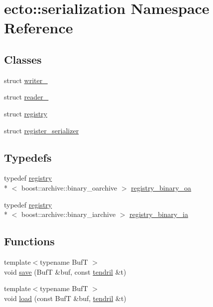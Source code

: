 \hypertarget{namespaceecto_1_1serialization}{\section{ecto\-:\-:serialization Namespace Reference}
\label{namespaceecto_1_1serialization}
}
\subsection*{Classes}
\begin{DoxyCompactItemize}
\item 
struct \hyperlink{structecto_1_1serialization_1_1writer__}{writer\-\_\-}
\item 
struct \hyperlink{structecto_1_1serialization_1_1reader__}{reader\-\_\-}
\item 
struct \hyperlink{structecto_1_1serialization_1_1registry}{registry}
\item 
struct \hyperlink{structecto_1_1serialization_1_1register__serializer}{register\-\_\-serializer}
\end{DoxyCompactItemize}
\subsection*{Typedefs}
\begin{DoxyCompactItemize}
\item 
typedef \hyperlink{structecto_1_1serialization_1_1registry}{registry}\\*
$<$ boost\-::archive\-::binary\-\_\-oarchive $>$ \hyperlink{namespaceecto_1_1serialization_ad544c8b5416e0ecfe692922b2f2e8e54}{registry\-\_\-binary\-\_\-oa}
\item 
typedef \hyperlink{structecto_1_1serialization_1_1registry}{registry}\\*
$<$ boost\-::archive\-::binary\-\_\-iarchive $>$ \hyperlink{namespaceecto_1_1serialization_a465425ff3a756de86571c1262f22d2ba}{registry\-\_\-binary\-\_\-ia}
\end{DoxyCompactItemize}
\subsection*{Functions}
\begin{DoxyCompactItemize}
\item 
{\footnotesize template$<$typename Buf\-T $>$ }\\void \hyperlink{namespaceecto_1_1serialization_a77b3e77a54adf1a888736007260a9343}{save} (Buf\-T \&buf, const \hyperlink{classecto_1_1tendril}{tendril} \&t)
\item 
{\footnotesize template$<$typename Buf\-T $>$ }\\void \hyperlink{namespaceecto_1_1serialization_a1960d58009e397c926055229f8e1c347}{load} (const Buf\-T \&buf, \hyperlink{classecto_1_1tendril}{tendril} \&t)
\end{DoxyCompactItemize}


